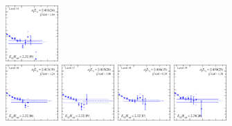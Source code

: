 \begin{figure}[H]
    \includegraphics[width=0.18\textwidth]{figures/sigmas/g2g/fits/fit_18.pdf}\\
    \includegraphics[width=0.18\textwidth]{figures/sigmas/g2g/fits/fit_17.pdf}
    \includegraphics[width=0.18\textwidth]{figures/sigmas/g2g/fits/fit_14.pdf}
    \includegraphics[width=0.18\textwidth]{figures/sigmas/g2g/fits/fit_15.pdf}
    \includegraphics[width=0.18\textwidth]{figures/sigmas/g2g/fits/fit_19.pdf}\\

\end{figure}
